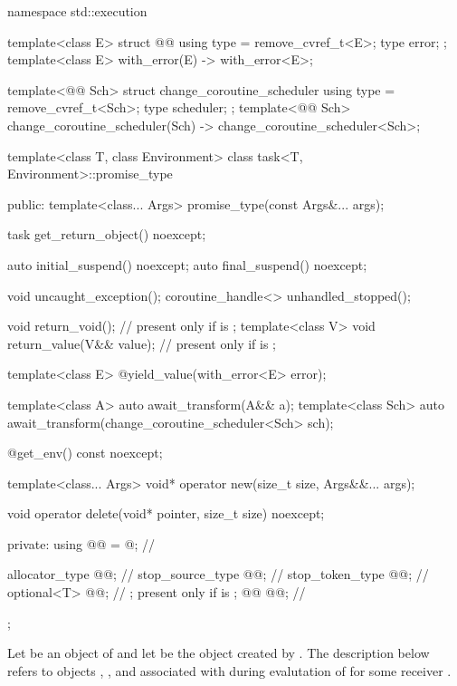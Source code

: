 \begin{codeblock}
namespace std::execution {
  template<class E>
  struct @@ {
    using type = remove_cvref_t<E>;
    type error;
  };
  template<class E>
    with_error(E) -> with_error<E>;

  template<@@ Sch>
  struct change_coroutine_scheduler {
    using type = remove_cvref_t<Sch>;
    type scheduler;
  };
  template<@@ Sch>
    change_coroutine_scheduler(Sch) -> change_coroutine_scheduler<Sch>;

  template<class T, class Environment>
  class task<T, Environment>::promise_type {
  public:
    template<class... Args>
      promise_type(const Args&... args);

    task get_return_object() noexcept;

    auto initial_suspend() noexcept;
    auto final_suspend() noexcept;

    void uncaught_exception();
    coroutine_handle<> unhandled_stopped();

    void return_void();                 // present only if  is ;
    template<class V>
      void return_value(V&& value);     // present only if  is ;

    template<class E>
      @\unspec@ yield_value(with_error<E> error);

    template<class A>
      auto await_transform(A&& a);
    template<class Sch>
      auto await_transform(change_coroutine_scheduler<Sch> sch);

    @\unspec@ get_env() const noexcept;

    template<class... Args>
      void* operator new(size_t size, Args&&... args);

    void operator delete(void* pointer, size_t size) noexcept;

  private:
    using @@ = @\seebelownc@;    // \expos

    allocator_type    @@;            // \expos
    stop_source_type  @@;           // \expos
    stop_token_type   @@;            // \expos
    optional<T>       @@;           // \expos; present only if  is ;
    @@     @@;           // \expos
  };
}
\end{codeblock}

\pnum
Let  be an object of 
and let  be the  object
created by .
The description below
refers to objects ,
,
and 
associated with 
during evalutation of 
for some receiver .

